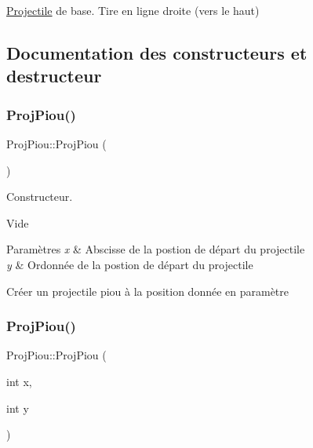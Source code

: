 \hyperlink{class_projectile}{Projectile} de base. Tire en ligne droite (vers le haut) 

\subsection{Documentation des constructeurs et destructeur}
\mbox{\label{class_proj_piou_a73d8a01dc3e09f926d14b95b673fd41d}} 
\subsubsection{\texorpdfstring{Proj\+Piou()}{ProjPiou()}\hspace{0.1cm}{\footnotesize\ttfamily [1/2]}}
{\footnotesize\ttfamily Proj\+Piou\+::\+Proj\+Piou (\begin{DoxyParamCaption}{ }\end{DoxyParamCaption})}



Constructeur. 

Vide


\begin{DoxyParams}{Paramètres}
{\em x} & Abscisse de la postion de départ du projectile \\
\hline
{\em y} & Ordonnée de la postion de départ du projectile\\
\hline
\end{DoxyParams}
Créer un projectile piou à la position donnée en paramètre \mbox{\label{class_proj_piou_a4aa12294ad8b563aa00848e395fdf06b}} 
\subsubsection{\texorpdfstring{Proj\+Piou()}{ProjPiou()}\hspace{0.1cm}{\footnotesize\ttfamily [2/2]}}
{\footnotesize\ttfamily Proj\+Piou\+::\+Proj\+Piou (\begin{DoxyParamCaption}\item[{int}]{x,  }\item[{int}]{y }\end{DoxyParamCaption})}

\mbox{\label{class_proj_piou_a02224f153ad53afc2b1c40b986ec6492}} 
